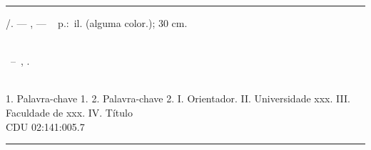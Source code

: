 \begin{fichacatalografica}
\sffamily{}
\vspace*{13.5cm} %
\hrule{} %
\begin{center} %
\begin{minipage}[c]{15cm} %
\imprimirautor{}
\hspace{0.5cm} \imprimirtitulo{}/\imprimirautor{}. ---
\imprimirlocal{}, \imprimirdata{} ---
\hspace{0.5cm}~\pageref{LastPage} p.:\ il. (alguma color.); 30 cm.\\
\hspace{0.5cm}\imprimirorientadorRotulo{} \imprimirorientador{}\\
\hspace{0.5cm}
\parbox[t]{\textwidth}{\imprimirtipotrabalho{}~--~\imprimirinstituicao{},
\imprimirdata{}.}\\
\hspace{0.5cm}
1. Palavra-chave 1.
2. Palavra-chave 2.
I. Orientador.
II\@. Universidade xxx.
III\@. Faculdade de xxx.
IV\@. Título\\
\hspace{8.75cm} CDU 02:141:005.7\\
\end{minipage}
\end{center}
\hrule
\end{fichacatalografica}
\cleardoublepage{}
